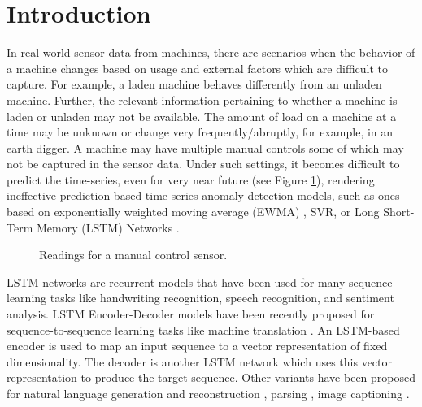 \documentclass{article}
\begin{document}
\section{Introduction}
In real-world sensor data from machines, there are scenarios when the behavior of a machine changes based on usage and external factors which are difficult to capture. For example, a laden machine behaves differently from an unladen machine. Further, the relevant information pertaining to whether a machine is laden or unladen may not be available. The amount of load on a machine at a time may be unknown or change very frequently/abruptly, for example, in an earth digger. A machine may have multiple manual controls some of which may not be captured in the sensor data. Under such settings, it becomes difficult to predict the time-series, even for very near future (see Figure \ref{fig:Predictability}), rendering ineffective prediction-based time-series anomaly detection models, such as ones based on exponentially weighted moving average (EWMA) \cite{stat_AD}, SVR\cite{ma2003online}, or Long Short-Term Memory (LSTM) Networks \cite{p:lstm-ad}.

\begin{figure}
    \centering
    \caption{\label{fig:Predictability}Readings for a manual control sensor.}
    \vspace{-14pt}
\end{figure}

LSTM networks \cite{hochreiter1997long} are recurrent models that have been used for many sequence learning tasks like handwriting recognition, speech recognition, and sentiment analysis. LSTM Encoder-Decoder models have been recently proposed for sequence-to-sequence learning tasks like machine translation \cite{p:seq2seq, p:seq2seqNIPS2014}. An LSTM-based encoder is used to map an input sequence to a vector representation of fixed dimensionality. The decoder is another LSTM network which uses this vector representation to produce the target sequence. Other variants have been proposed for natural language generation and reconstruction \cite{p:autoencoderLanguageGen}, parsing \cite{vinyals2015grammar}, image captioning \cite{p:tensorflowEncDec}.
\end{document}
